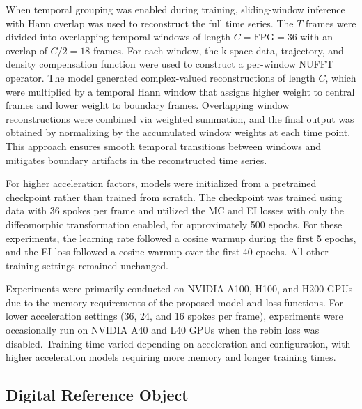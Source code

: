 \documentclass[runningheads]{llncs}
\begin{document}
When temporal grouping was enabled during training, sliding-window inference with Hann overlap was used to reconstruct the full time series. The $T$ frames were divided into overlapping temporal windows of length $C = \mathrm{FPG} = 36$ with an overlap of $C/2 = 18$ frames. For each window, the k-space data, trajectory, and density compensation function were used to construct a per-window NUFFT operator. The model generated complex-valued reconstructions of length $C$, which were multiplied by a temporal Hann window that assigns higher weight to central frames and lower weight to boundary frames. Overlapping window reconstructions were combined via weighted summation, and the final output was obtained by normalizing by the accumulated window weights at each time point. This approach ensures smooth temporal transitions between windows and mitigates boundary artifacts in the reconstructed time series.

For higher acceleration factors, models were initialized from a pretrained checkpoint rather than trained from scratch. The checkpoint was trained using data with 36 spokes per frame and utilized the MC and EI losses with only the diffeomorphic transformation enabled, for approximately 500 epochs. For these experiments, the learning rate followed a cosine warmup during the first 5 epochs, and the EI loss followed a cosine warmup over the first 40 epochs. All other training settings remained unchanged.

Experiments were primarily conducted on NVIDIA A100, H100, and H200 GPUs due to the memory requirements of the proposed model and loss functions. For lower acceleration settings (36, 24, and 16 spokes per frame), experiments were occasionally run on NVIDIA A40 and L40 GPUs when the rebin loss was disabled. Training time varied depending on acceleration and configuration, with higher acceleration models requiring more memory and longer training times. 



\subsection{Digital Reference Object}



\end{document}

